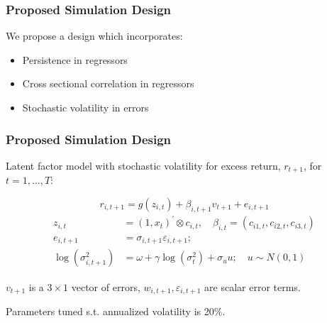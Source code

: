 \documentclass[aspectratio=169]{beamer}
\begin{document}


\begin{frame}
\frametitle{Proposed Simulation Design}
We propose a design which incorporates:
\begin{itemize}
\item Persistence in regressors
\item Cross sectional correlation in regressors
\item Stochastic volatility in errors
\end{itemize}
\end{frame}

\begin{frame}
\frametitle{Proposed Simulation Design}
Latent factor model with stochastic volatility for excess return, $r_{t+1}$, for $t=1,\dots,T$:

\begin{equation}
r_{i, t+1} = 
g\left(z_{i, t}\right) + \beta_{i,t+1}v_{t+1} + e_{i, t+1}
\end{equation}
\begin{align}
z_{i, t} &=\left(1, x_{t}\right)^{\prime} \otimes c_{i, t}, 
\quad \beta_{i, t}=\left(c_{i 1, t}, c_{i 2, t}, c_{i 3, t}\right) \\ 
e_{i, t+1} &= 
\sigma_{i, t+1} \varepsilon_{i, t+1}; \\
\operatorname{log} (\sigma^2_{i,t+1}) &= 
\omega + \gamma \operatorname{log} (\sigma^2_{t}) + \sigma_{u}u; 
\quad u \sim N(0, 1)
\end{align}

$v_{t+1}$ is a $3\times 1$ vector of errors, $w_{i,t+1},\varepsilon_{i,t+1}$ are scalar error terms.

Parameters tuned s.t. annualized volatility is 20\%.
\end{frame}
\end{document}
